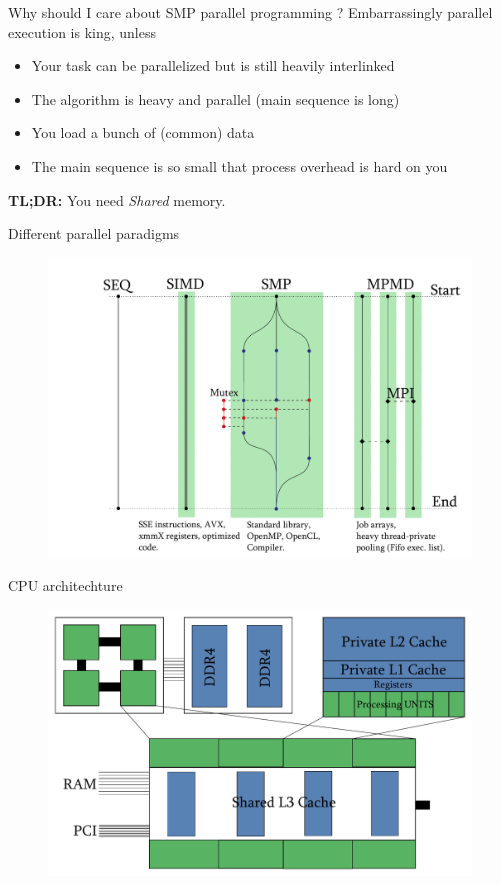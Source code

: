 \begin{frame}{Why should I care about SMP parallel programming ?}
    Embarrassingly parallel execution is king, unless
    \begin{itemize}
        \item Your task can be parallelized but is still heavily interlinked
        \item The algorithm is heavy and parallel (main sequence is long)
        \item You load a bunch of (common) data
        \item The main sequence is so small that process overhead is hard on you
    \end{itemize}
    \textbf{TL;DR:} You need \emph{Shared} memory.
\end{frame}
\begin{frame}{Different parallel paradigms}
    \begin{figure}
        \centering
        \includegraphics[width=1.0\textwidth]{pdf/parallelism.pdf}
    \end{figure}
\end{frame}
\begin{frame}{CPU architechture}
    \begin{figure}
        \centering
        \includegraphics[width=1.0\textwidth]{pdf/architechture.pdf}
    \end{figure}
\end{frame}


